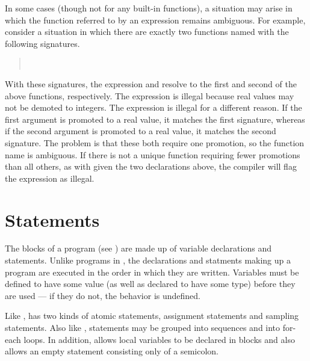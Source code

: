 In some cases (though not for any built-in \Stan functions), a
situation may arise in which the function referred to by an
expression remains ambiguous.  For example, consider a situation in
which there are exactly two functions named  with the
following signatures.
%
\begin{quote}
\\
\end{quote}
%
With these signatures, the expression  and
 resolve to the first and second of the above
functions, respectively.  The expression  is
illegal because real values may not be demoted to integers.  The
expression  is illegal for a different reason.  If the
first argument is promoted to a real value, it matches the first
signature, whereas if the second argument is promoted to a real value,
it matches the second signature.  The problem is that these both
require one promotion, so the function name  is ambiguous.
If there is not a unique function requiring fewer promotions than all
others, as with  given the two declarations above, 
the \Stan compiler will flag the expression as illegal. 








\chapter{Statements}

\noindent 
The blocks of a \Stan program (see ) are made up of
variable declarations and statements.  Unlike programs in \BUGS, the
declarations and statments making up a \Stan program are executed in
the order in which they are written.  Variables must be defined to
have some value (as well as declared to have some type) before they
are used --- if they do not, the behavior is undefined.

Like \BUGS, \Stan has two kinds of atomic statements, assignment
statements and sampling statements.  Also like \BUGS, statements may
be grouped into sequences and into for-each loops.  In addition, \Stan
allows local variables to be declared in blocks and also allows an
empty statement consisting only of a semicolon.

